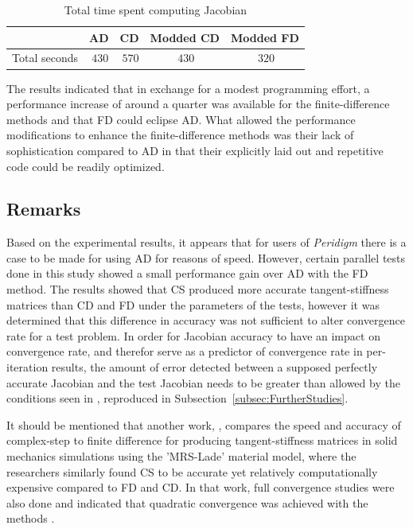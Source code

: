 \documentclass[preprint,12pt]{elsarticle}
\begin{document}
\begin{table}[!ht]   
\centering \caption{Total time spent computing Jacobian} 
\label{tab:PerformanceMod}   
\begin{tabular}{c c c c c}
\toprule & AD & CD & Modded CD & Modded FD\\
\midrule  Total seconds & $~430$ & $~570$ & $~430$ &$~320$ \\ 
\bottomrule \end{tabular} \end{table}

The results indicated that in exchange for a modest programming effort, a
performance increase of around a quarter was available for the
finite-difference methods and that FD could eclipse AD. What allowed the performance modifications to
enhance the finite-difference methods was their lack of sophistication
compared to AD in that their explicitly laid out and
repetitive code could be readily optimized. 

\subsection{Remarks}
Based on the experimental results, it appears that for users of \emph{Peridigm}
there is a case to be made for using AD for reasons of speed. However, certain
parallel tests done in this study showed a small performance gain over AD with
the FD method.  The results showed that CS produced more accurate
tangent-stiffness matrices than CD and FD under the parameters of the tests,
however it was determined that this difference in accuracy was not sufficient
to alter convergence rate for a test problem. In order for Jacobian accuracy to
have an impact on convergence rate, and therefor serve as a predictor of
convergence rate in per-iteration results, the amount of error detected between
a supposed perfectly accurate Jacobian and the test Jacobian needs to be
greater than allowed by the conditions seen in \cite{burkeLectures}, 
reproduced in Subsection~\ref{subsec:FurtherStudies}. 

It should be mentioned that another work, \cite{perez2012numerical}, compares
the speed and accuracy of complex-step to finite difference for producing
tangent-stiffness matrices in solid mechanics simulations using the 'MRS-Lade'
material model, where the researchers similarly found CS to be accurate yet
relatively computationally expensive compared to FD and CD. In that work, full
convergence studies were also done and indicated that quadratic convergence was
achieved with the methods \cite[p.28]{perez2012numerical}.
\end{document}

